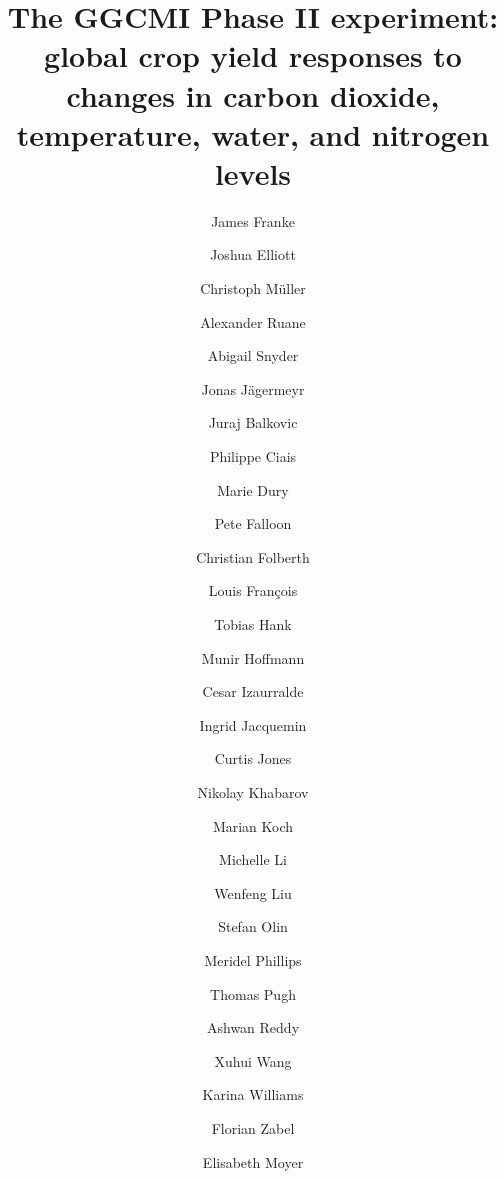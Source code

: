\documentclass[preprint, 5p, times, twocolumn]{elsarticle}
\begin{document}
\begin{frontmatter}

\title{The GGCMI Phase II experiment: global crop yield responses to changes in carbon dioxide, temperature, water, and nitrogen levels}

\author[1,2]{James Franke}
\author[2,3]{Joshua Elliott}
\author[4]{Christoph M\"{u}ller}
\author[5]{Alexander Ruane}
\author[6]{Abigail Snyder}
\author[3,2,4,5]{Jonas J\"{a}germeyr}
\author[7,8]{Juraj Balkovic}
\author[9,10]{Philippe Ciais}
\author[11]{Marie Dury}
\author[12]{Pete Falloon}
\author[7]{Christian Folberth}
\author[11]{Louis Fran{\c{c}}ois}
\author[13]{Tobias Hank}
\author[14]{Munir Hoffmann}
\author[15,16]{Cesar Izaurralde}
\author[11]{Ingrid Jacquemin}
\author[15]{Curtis Jones}
\author[7]{Nikolay Khabarov}
\author[14]{Marian Koch}
\author[2, 17]{Michelle Li}
\author[18,9]{Wenfeng Liu}
\author[19]{Stefan Olin}
\author[5,20]{Meridel Phillips}
\author[21,22]{Thomas Pugh}
\author[15]{Ashwan Reddy}
\author[9,10]{Xuhui Wang}
\author[12]{Karina Williams}
\author[13]{Florian Zabel}
\author[1,2]{Elisabeth Moyer}


\end{frontmatter}
\end{document}
